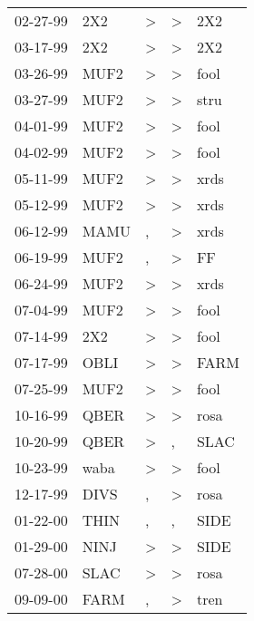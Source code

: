 \begin{supertabular}{lllll}
 02-27-99 &   2X2 &  \textgreater &  \textgreater &   2X2 \\
 03-17-99 &   2X2 &  \textgreater &  \textgreater &   2X2 \\
 03-26-99 &  MUF2 &  \textgreater &  \textgreater &  fool \\
 03-27-99 &  MUF2 &  \textgreater &  \textgreater &  stru \\
 04-01-99 &  MUF2 &  \textgreater &  \textgreater &  fool \\
 04-02-99 &  MUF2 &  \textgreater &  \textgreater &  fool \\
 05-11-99 &  MUF2 &  \textgreater &  \textgreater &  xrds \\
 05-12-99 &  MUF2 &  \textgreater &  \textgreater &  xrds \\
 06-12-99 &  MAMU &             , &  \textgreater &  xrds \\
 06-19-99 &  MUF2 &             , &  \textgreater &    FF \\
 06-24-99 &  MUF2 &  \textgreater &  \textgreater &  xrds \\
 07-04-99 &  MUF2 &  \textgreater &  \textgreater &  fool \\
 07-14-99 &   2X2 &  \textgreater &  \textgreater &  fool \\
 07-17-99 &  OBLI &  \textgreater &  \textgreater &  FARM \\
 07-25-99 &  MUF2 &  \textgreater &  \textgreater &  fool \\
 10-16-99 &  QBER &  \textgreater &  \textgreater &  rosa \\
 10-20-99 &  QBER &  \textgreater &             , &  SLAC \\
 10-23-99 &  waba &  \textgreater &  \textgreater &  fool \\
 12-17-99 &  DIVS &             , &  \textgreater &  rosa \\
 01-22-00 &  THIN &             , &             , &  SIDE \\
 01-29-00 &  NINJ &  \textgreater &  \textgreater &  SIDE \\
 07-28-00 &  SLAC &  \textgreater &  \textgreater &  rosa \\
 09-09-00 &  FARM &             , &  \textgreater &  tren \\
\end{supertabular}
